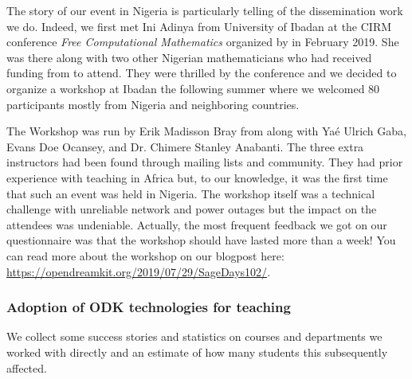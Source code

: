 \begin{enumerate}
  The story of our event in Nigeria is particularly telling of the 
  dissemination work we do. Indeed, we first met Ini Adinya from University of Ibadan at the
  CIRM conference \emph{Free Computational Mathematics} organized by \ODK in February 2019. She 
  was there along with two other Nigerian mathematicians who had received funding from \ODK to attend. 
  They were thrilled by the conference and we decided to organize a \Sage workshop at Ibadan the 
  following summer where we welcomed 80 participants mostly from Nigeria and neighboring countries.
  
  The Workshop was run by Erik Madisson Bray from \ODK along with Yaé Ulrich Gaba, Evans Doe Ocansey, and Dr. Chimere 
  Stanley Anabanti. The three extra instructors had been found through \Sage mailing lists and community. They had prior
  experience with teaching \Sage in Africa but, to our knowledge, it was the first time that such an event was held in Nigeria.
  The workshop itself was a technical challenge with unreliable network and power outages but the impact on the attendees was
  undeniable. Actually, the most frequent feedback we got on our questionnaire was that the workshop should have lasted more than 
  a week! You can read more about the workshop on our blogpost here: \url{https://opendreamkit.org/2019/07/29/SageDays102/}.
 
\end{enumerate}

\subsubsection{Adoption of ODK technologies for teaching}

We collect some success stories and statistics on courses and
departments we worked with directly and an estimate of how many
students this subsequently affected.


